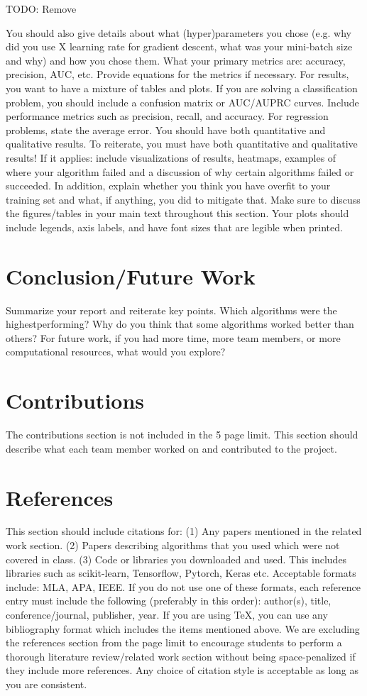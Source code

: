 \documentclass{article}
\begin{document}
TODO: Remove

You should also give details about what (hyper)parameters you chose (e.g. why did you
use X learning rate for gradient descent, what was your mini-batch size and why) and how
you chose them. What your primary metrics are: accuracy, precision,
AUC, etc. Provide equations for the metrics if necessary. For results, you want to have a
mixture of tables and plots. If you are solving a classification problem, you should include a
confusion matrix or AUC/AUPRC curves. Include performance metrics such as precision,
recall, and accuracy. For regression problems, state the average error. You should have
both quantitative and qualitative results. To reiterate, you must have both quantitative
and qualitative results! If it applies: include visualizations of results, heatmaps,
examples of where your algorithm failed and a discussion of why certain algorithms failed
or succeeded. In addition, explain whether you think you have overfit to your training set
and what, if anything, you did to mitigate that. Make sure to discuss the figures/tables in
your main text throughout this section. Your plots should include legends, axis labels, and
have font sizes that are legible when printed.

\section{Conclusion/Future Work }
Summarize your report and reiterate key points. Which algorithms were the highestperforming?
Why do you think that some algorithms worked better than others? For
future work, if you had more time, more team members, or more computational resources,
what would you explore?

\section{Contributions}
The contributions section is not included in the 5 page limit. This section should describe
what each team member worked on and contributed to the project.

\section*{References}
This section should include citations for: (1) Any papers mentioned in the related work
section. (2) Papers describing algorithms that you used which were not covered in class.
(3) Code or libraries you downloaded and used. This includes libraries such as scikit-learn, Tensorflow, Pytorch, Keras etc. Acceptable formats include: MLA, APA, IEEE. If you
do not use one of these formats, each reference entry must include the following (preferably
in this order): author(s), title, conference/journal, publisher, year. If you are using TeX,
you can use any bibliography format which includes the items mentioned above. We are excluding
the references section from the page limit to encourage students to perform a thorough
literature review/related work section without being space-penalized if they include more
references. Any choice of citation style is acceptable
as long as you are consistent. 
\end{document}
